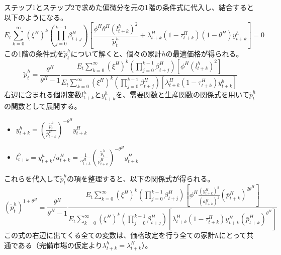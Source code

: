 ステップ1とステップ2で求めた偏微分を元の1階の条件式に代入し、結合すると以下のようになる。
\begin{equation}
E_t\sum_{k=0}^{\infty}(\xi^H)^k\left(\prod_{j=0}^{k-1}\beta_{t+j}^H\right)\left[\frac{\phi^H\theta^H(l_{t+k}^h)^2}{\widetilde{p}_t^h}+\lambda_{t+k}^H(1-\tau_{t+k}^H)(1-\theta^H)y_{t+k}^h\right]=0
\label{eq:appendix_optimal_price_derivation_foc_sub3_combined}
\end{equation}
この1階の条件式を\(\widetilde{p}_t^h\)について解くと、個々の家計\(h\)の最適価格が得られる。
\begin{equation}
\widetilde{p}_t^h=\frac{\theta^H}{\theta^H-1}\frac{E_t\sum_{k=0}^{\infty}(\xi^H)^k\left(\prod_{j=0}^{k-1}\beta_{t+j}^H\right)\left[\phi^H(l_{t+k}^h)^2\right]}{E_t\sum_{k=0}^{\infty}(\xi^H)^k\left(\prod_{j=0}^{k-1}\beta_{t+j}^H\right)\left[\lambda_{t+k}^H(1-\tau_{t+k}^H)y_{t+k}^h\right]}
\label{eq:appendix_optimal_price_derivation_foc_sub3_h_solution}
\end{equation}
右辺に含まれる個別変数\(l_{t+k}^h\)と\(y_{t+k}^h\)を、需要関数と生産関数の関係式を用いて\(\widetilde{p}_t^h\)の関数として展開する。

\begin{itemize}
    \item\label{itm:appendix_optimal_price_derivation_foc_sub3_y_exp} \(y_{t+k}^h=\left(\frac{\widetilde{p}_t^h}{\bar{p}_{t+k}^H}\right)^{-\theta^H}y_{t+k}^H\)
    \item\label{itm:appendix_optimal_price_derivation_foc_sub3_l_exp} \(l_{t+k}^h=y_{t+k}^h/a_{t+k}^H=\frac{1}{a_{t+k}^H}\left(\frac{\widetilde{p}_t^h}{\bar{p}_{t+k}^H}\right)^{-\theta^H}y_{t+k}^H\)
\end{itemize}

これらを代入して\(\widetilde{p}_t^h\)の項を整理すると、以下の関係式が得られる。
\begin{equation}
(\widetilde{p}_t^h)^{1+\theta^H}=\frac{\theta^H}{\theta^H-1}\frac{E_t\sum_{k=0}^{\infty}(\xi^H)^k\left(\prod_{j=0}^{k-1}\beta_{t+j}^H\right)\left[\phi^H\frac{(y_{t+k}^H)^2}{(a_{t+k}^H)^2}(\bar{p}_{t+k}^H)^{2\theta^H}\right]}{E_t\sum_{k=0}^{\infty}(\xi^H)^k\left(\prod_{j=0}^{k-1}\beta_{t+j}^H\right)\left[\lambda_{t+k}^H(1-\tau_{t+k}^H)y_{t+k}^H(\bar{p}_{t+k}^H)^{\theta^H}\right]}
\label{eq:appendix_optimal_price_derivation_foc_sub3_common_form}
\end{equation}
この式の右辺に出てくる全ての変数は、価格改定を行う全ての家計\(h\)にとって共通である（完備市場の仮定より\(\lambda_{t+k}^h=\lambda_{t+k}^H\)）。

